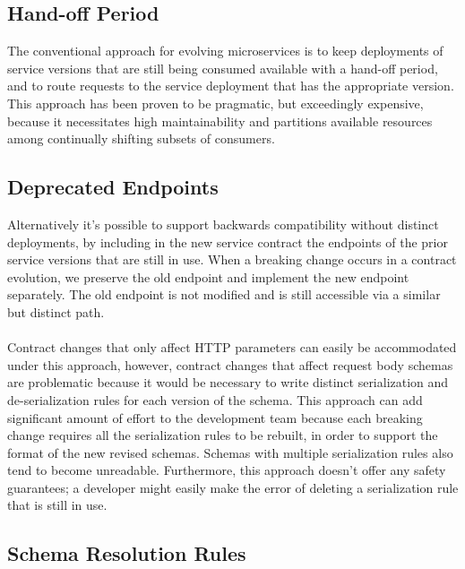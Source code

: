 \subsection{Hand-off Period} %
\label{sec:hand_off_period}

The conventional approach for evolving microservices is to keep deployments of service versions that are still being consumed available with a hand-off period,
and to route requests to the service deployment that has the appropriate version.
This approach has been proven to be pragmatic, but exceedingly expensive,
because it necessitates high maintainability and partitions available resources among continually shifting subsets of consumers.

\subsection{Deprecated Endpoints} %
\label{sec:deprecated_endpoints}

Alternatively it's possible to support backwards compatibility without distinct deployments,
by including in the new service contract the endpoints of the prior service versions that are still in use.
When a breaking change occurs in a contract evolution, we preserve the old endpoint and implement the new endpoint separately.
The old endpoint is not modified and is still accessible via a similar but distinct path.

\paragraph{}

Contract changes that only affect HTTP parameters can easily be accommodated under this approach, however, contract changes that affect
request body schemas are problematic because it would be necessary to write distinct serialization and de-serialization rules for each version of the schema.
This approach can add significant amount of effort to the development team because each breaking change requires all the serialization rules to be rebuilt,
in order to support the format of the new revised schemas.
Schemas with multiple serialization rules also tend to become unreadable.
Furthermore, this approach doesn't offer any safety guarantees;
a developer might easily make the error of deleting a serialization rule that is still in use.

\subsection{Schema Resolution Rules} %
\label{sec:schema_resolution_rules}

